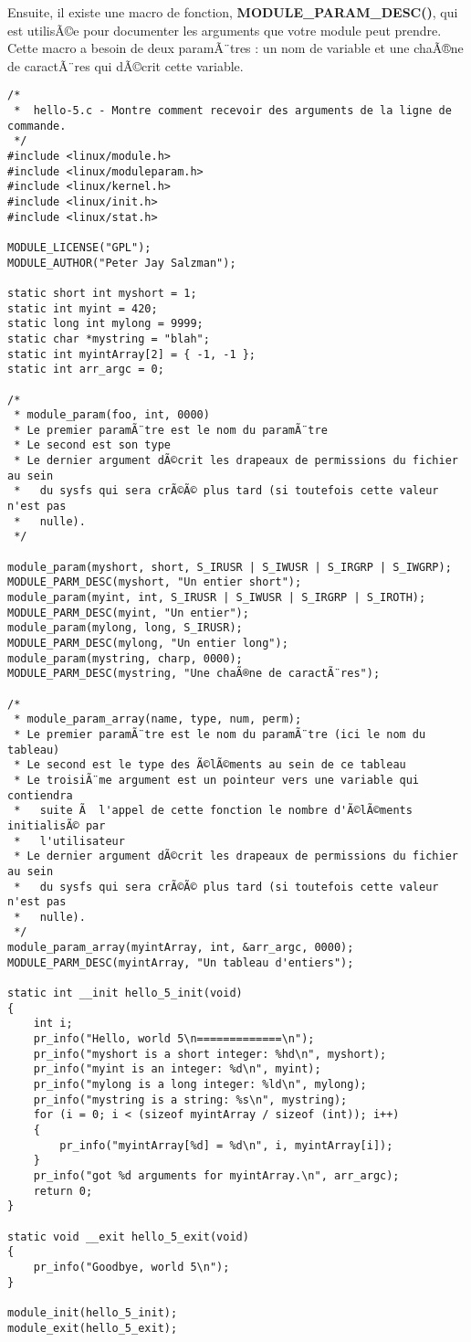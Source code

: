\documentclass[11pt]{article}
\begin{document}
Ensuite, il existe une macro de fonction, \textbf{MODULE\_PARAM\_DESC()}, qui est utilisÃ©e pour documenter les arguments que votre module peut prendre. Cette macro a besoin de deux paramÃ¨tres : un nom de variable et une chaÃ®ne de caractÃ¨res qui dÃ©crit cette variable.

\begin{verbatim}
/*
 *  hello-5.c - Montre comment recevoir des arguments de la ligne de commande.
 */
#include <linux/module.h>
#include <linux/moduleparam.h>
#include <linux/kernel.h>
#include <linux/init.h>
#include <linux/stat.h>

MODULE_LICENSE("GPL");
MODULE_AUTHOR("Peter Jay Salzman");

static short int myshort = 1;
static int myint = 420;
static long int mylong = 9999;
static char *mystring = "blah";
static int myintArray[2] = { -1, -1 };
static int arr_argc = 0;

/*
 * module_param(foo, int, 0000)
 * Le premier paramÃ¨tre est le nom du paramÃ¨tre
 * Le second est son type
 * Le dernier argument dÃ©crit les drapeaux de permissions du fichier au sein
 *   du sysfs qui sera crÃ©Ã© plus tard (si toutefois cette valeur n'est pas
 *   nulle).
 */

module_param(myshort, short, S_IRUSR | S_IWUSR | S_IRGRP | S_IWGRP);
MODULE_PARM_DESC(myshort, "Un entier short");
module_param(myint, int, S_IRUSR | S_IWUSR | S_IRGRP | S_IROTH);
MODULE_PARM_DESC(myint, "Un entier");
module_param(mylong, long, S_IRUSR);
MODULE_PARM_DESC(mylong, "Un entier long");
module_param(mystring, charp, 0000);
MODULE_PARM_DESC(mystring, "Une chaÃ®ne de caractÃ¨res");

/*
 * module_param_array(name, type, num, perm);
 * Le premier paramÃ¨tre est le nom du paramÃ¨tre (ici le nom du tableau)
 * Le second est le type des Ã©lÃ©ments au sein de ce tableau
 * Le troisiÃ¨me argument est un pointeur vers une variable qui contiendra
 *   suite Ã  l'appel de cette fonction le nombre d'Ã©lÃ©ments initialisÃ© par
 *   l'utilisateur
 * Le dernier argument dÃ©crit les drapeaux de permissions du fichier au sein
 *   du sysfs qui sera crÃ©Ã© plus tard (si toutefois cette valeur n'est pas
 *   nulle).
 */
module_param_array(myintArray, int, &arr_argc, 0000);
MODULE_PARM_DESC(myintArray, "Un tableau d'entiers");

static int __init hello_5_init(void)
{
    int i;
    pr_info("Hello, world 5\n=============\n");
    pr_info("myshort is a short integer: %hd\n", myshort);
    pr_info("myint is an integer: %d\n", myint);
    pr_info("mylong is a long integer: %ld\n", mylong);
    pr_info("mystring is a string: %s\n", mystring);
    for (i = 0; i < (sizeof myintArray / sizeof (int)); i++)
    {
        pr_info("myintArray[%d] = %d\n", i, myintArray[i]);
    }
    pr_info("got %d arguments for myintArray.\n", arr_argc);
    return 0;
}

static void __exit hello_5_exit(void)
{
    pr_info("Goodbye, world 5\n");
}

module_init(hello_5_init);
module_exit(hello_5_exit);
\end{verbatim}
\end{document}
